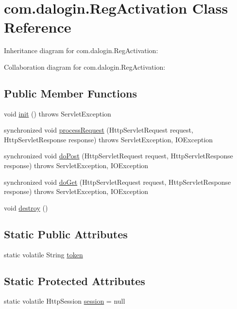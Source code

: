 \hypertarget{classcom_1_1dalogin_1_1_reg_activation}{}\section{com.\+dalogin.\+Reg\+Activation Class Reference}
\label{classcom_1_1dalogin_1_1_reg_activation}


Inheritance diagram for com.\+dalogin.\+Reg\+Activation\+:


Collaboration diagram for com.\+dalogin.\+Reg\+Activation\+:
\subsection*{Public Member Functions}
\begin{DoxyCompactItemize}
\item 
void \hyperlink{classcom_1_1dalogin_1_1_reg_activation_a376fe8d51e3eed6ac4e920e625fefb18}{init} ()  throws Servlet\+Exception     
\item 
synchronized void \hyperlink{classcom_1_1dalogin_1_1_reg_activation_a7b492755e9edafd6120693293ef69b61}{process\+Request} (Http\+Servlet\+Request request, Http\+Servlet\+Response response)  throws Servlet\+Exception, I\+O\+Exception 
\item 
synchronized void \hyperlink{classcom_1_1dalogin_1_1_reg_activation_a669791733a98622ae2aa9c241e7e2423}{do\+Post} (Http\+Servlet\+Request request, Http\+Servlet\+Response response)  throws Servlet\+Exception, I\+O\+Exception     
\item 
synchronized void \hyperlink{classcom_1_1dalogin_1_1_reg_activation_a1cec7329dc6fac61960cf952a6b33abf}{do\+Get} (Http\+Servlet\+Request request, Http\+Servlet\+Response response)  throws Servlet\+Exception, I\+O\+Exception     
\item 
void \hyperlink{classcom_1_1dalogin_1_1_reg_activation_a31466087421b04e28b6f3cf5b0463a4f}{destroy} ()
\end{DoxyCompactItemize}
\subsection*{Static Public Attributes}
\begin{DoxyCompactItemize}
\item 
static volatile String \hyperlink{classcom_1_1dalogin_1_1_reg_activation_a4b3fc10f0de933d144c3a99bee59eeac}{token}
\end{DoxyCompactItemize}
\subsection*{Static Protected Attributes}
\begin{DoxyCompactItemize}
\item 
static volatile Http\+Session \hyperlink{classcom_1_1dalogin_1_1_reg_activation_a5cc5e9abff75e875129939ee06f2e7a6}{session} = null
\end{DoxyCompactItemize}


